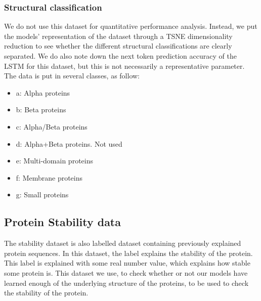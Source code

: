 \noindent
\subsubsection{Structural classification}
We do not use this dataset for quantitative performance analysis. Instead, we put the models' representation of the dataset through a TSNE dimensionality reduction to see whether the different structural classifications are clearly separated. We do also note down the next token prediction accuracy of the LSTM for this dataset, but this is not necessarily a representative parameter. The data is put in several classes, as follow:
\begin{itemize}
	\item a: Alpha proteins
	\item b: Beta proteins
	\item c: Alpha/Beta proteins
	\item d: Alpha+Beta proteins. Not used
	\item e: Multi-domain proteins
	\item f: Membrane proteins
	\item g: Small proteins
\end{itemize}

\subsection{Protein Stability data}
The stability dataset is also labelled dataset containing previously explained protein sequences. In this dataset, the label explains the stability of the protein. This label is explained with some real number value, which explains how stable some protein is. This dataset we use, to check whether or not our models have learned enough of the underlying structure of the proteins, to be used to check the stability of the protein.